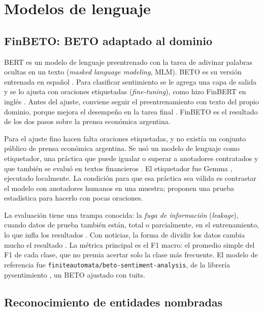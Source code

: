 \section{Modelos de lenguaje}
\label{sec:tec-lenguaje}

\subsection{FinBETO: BETO adaptado al dominio}

BERT \citep{devlin2019bert} es un modelo de lenguaje preentrenado con la tarea de adivinar
palabras ocultas en un texto (\textit{masked language modeling}, MLM). BETO es su versión
entrenada en español \citep{canete2020beto}. Para clasificar sentimiento se le agrega una capa
de salida y se lo ajusta con oraciones etiquetadas (\textit{fine-tuning}), como hizo FinBERT
en inglés \citep{araci2019finbert}. Antes del ajuste, conviene seguir el preentrenamiento con
texto del propio dominio, porque mejora el desempeño en la tarea final
\citep{gururangan2020dapt}. FinBETO es el resultado de los dos pasos sobre la prensa económica
argentina.

Para el ajuste fino hacen falta oraciones etiquetadas, y no existía un conjunto público de
prensa económica argentina. Se usó un modelo de lenguaje como etiquetador, una práctica que
puede igualar o superar a anotadores contratados \citep{gilardi2023chatgpt} y que también se
evaluó en textos financieros \citep{aguda2024llmannot}. El etiquetador fue Gemma
\citep{gemma2026gemma4}, ejecutado localmente. La condición para que esa práctica sea válida
es contrastar el modelo con anotadores humanos en una muestra; \citet{calderon2025alttest}
proponen una prueba estadística para hacerlo con pocas oraciones.

La evaluación tiene una trampa conocida: la \textit{fuga de información}
(\textit{leakage}), cuando datos de prueba también están, total o parcialmente, en el
entrenamiento, lo que infla los resultados \citep{kapoor2023leakage}. Con noticias, la forma de
dividir los datos cambia mucho el resultado \citep{xue2026temporal}. La métrica principal es
el F1 macro: el promedio simple del F1 de cada clase, que no premia acertar solo la clase más
frecuente. El modelo de referencia fue \texttt{finiteautomata/beto-sentiment-analysis}, de la
librería pysentimiento \citep{perez2021pysentimiento}, un BETO ajustado con tuits.

\subsection{Reconocimiento de entidades nombradas}

